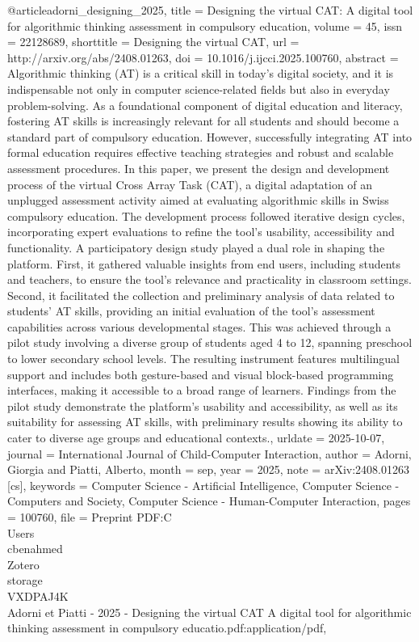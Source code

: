 @article{adorni_designing_2025,
	title = {Designing the virtual {CAT}: {A} digital tool for algorithmic thinking assessment in compulsory education},
	volume = {45},
	issn = {22128689},
	shorttitle = {Designing the virtual {CAT}},
	url = {http://arxiv.org/abs/2408.01263},
	doi = {10.1016/j.ijcci.2025.100760},
	abstract = {Algorithmic thinking (AT) is a critical skill in today's digital society, and it is indispensable not only 
in computer science-related fields but also in everyday problem-solving. As a foundational component of digital education and 
literacy, fostering AT skills is increasingly relevant for all students and should become a standard part of compulsory 
education. However, successfully integrating AT into formal education requires effective teaching strategies and robust and 
scalable assessment procedures. In this paper, we present the design and development process of the virtual Cross Array Task 
(CAT), a digital adaptation of an unplugged assessment activity aimed at evaluating algorithmic skills in Swiss compulsory 
education. The development process followed iterative design cycles, incorporating expert evaluations to refine the tool's 
usability, accessibility and functionality. A participatory design study played a dual role in shaping the platform. First, it 
gathered valuable insights from end users, including students and teachers, to ensure the tool's relevance and practicality in 
classroom settings. Second, it facilitated the collection and preliminary analysis of data related to students' AT skills, 
providing an initial evaluation of the tool's assessment capabilities across various developmental stages. This was achieved 
through a pilot study involving a diverse group of students aged 4 to 12, spanning preschool to lower secondary school levels. 
The resulting instrument features multilingual support and includes both gesture-based and visual block-based programming 
interfaces, making it accessible to a broad range of learners. Findings from the pilot study demonstrate the platform's 
usability and accessibility, as well as its suitability for assessing AT skills, with preliminary results showing its ability to 
cater to diverse age groups and educational contexts.},
	urldate = {2025-10-07},
	journal = {International Journal of Child-Computer Interaction},
	author = {Adorni, Giorgia and Piatti, Alberto},
	month = sep,
	year = {2025},
	note = {arXiv:2408.01263 [cs]},
	keywords = {Computer Science - Artificial Intelligence, Computer Science - Computers and Society, Computer Science - 
Human-Computer Interaction},
	pages = {100760},
	file = {Preprint PDF:C\:\\Users\\cbenahmed\\Zotero\\storage\\VXDPAJ4K\\Adorni et Piatti - 2025 - Designing the virtual 
CAT A digital tool for algorithmic thinking assessment in compulsory educatio.pdf:application/pdf},
}

